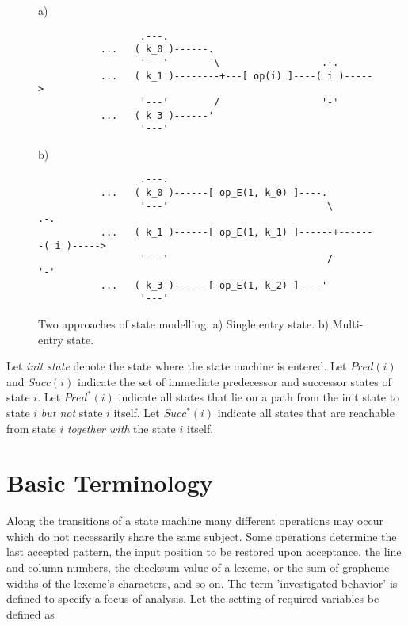 \documentclass[12pt,a4paper]{scrartcl}
\begin{document}
\begin{figure}[htbp] \leavevmode \label{fig:se-vs-me}
a)

\begin{verbatim}
                  .---.  
           ...   ( k_0 )------.
                  '---'        \                  .-.
           ...   ( k_1 )--------+---[ op(i) ]----( i )----->   
                  '---'        /                  '-'
           ...   ( k_3 )------'       
                  '---'
\end{verbatim}
     
b)
     
\begin{verbatim}
                  .---.
           ...   ( k_0 )------[ op_E(1, k_0) ]----.
                  '---'                            \         .-.
           ...   ( k_1 )------[ op_E(1, k_1) ]------+-------( i )----->  
                  '---'                            /         '-'
           ...   ( k_3 )------[ op_E(1, k_2) ]----'       
                  '---'
\end{verbatim}
\caption{Two approaches of state modelling: a) Single entry state. 
b) Multi-entry state.}
\end{figure}

Let \textit{init state} denote the state where the state machine is entered.
Let $Pred(i)$ and $Succ(i)$ indicate the set of immediate predecessor and
successor states of state $i$. Let $Pred^*(i)$ indicate all states that lie on
a path from the init state to state $i$ \textit{but not} state $i$
itself. Let $Succ^*(i)$ indicate all states that are reachable from state $i$
\textit{together with} the state $i$ itself.


%
\section{Basic Terminology}

Along the transitions of a state machine many different operations may occur
which do not necessarily share the same subject. Some operations determine the
last accepted pattern, the input position to be restored upon acceptance, the
line and column numbers, the checksum value of a lexeme, or the sum of grapheme
widths of the lexeme's characters, and so on. The term 'investigated behavior'
is defined to specify a focus of analysis.  Let the setting of required
variables be defined as
\end{document}

